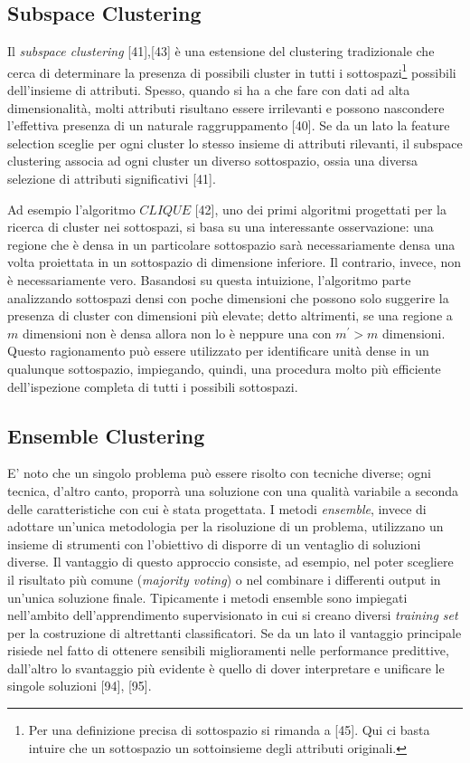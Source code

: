 \subsection{Subspace Clustering}
\label{subsec:subspace_clustering}
Il \textit{subspace clustering} [41],[43] \`e una estensione del clustering tradizionale che cerca di determinare la presenza di possibili cluster in tutti i sottospazi\footnote{Per una definizione precisa di sottospazio si rimanda a [45]. Qui ci basta intuire che un sottospazio un sottoinsieme degli attributi originali.} possibili dell'insieme di attributi.
Spesso, quando si ha a che fare con dati ad alta dimensionalit\`a, molti attributi risultano essere irrilevanti e possono nascondere l'effettiva presenza di un naturale raggruppamento [40]. Se da un lato la feature selection sceglie per ogni cluster lo stesso insieme di attributi rilevanti, il subspace clustering associa ad ogni cluster un diverso sottospazio, ossia una diversa selezione di attributi significativi [41].

Ad esempio l'algoritmo $ CLIQUE $ [42], uno dei primi algoritmi progettati per la ricerca di cluster nei sottospazi, si basa su una interessante osservazione: una regione che \`e densa in un particolare sottospazio sar\`a necessariamente densa una volta proiettata in un sottospazio di dimensione inferiore. Il contrario, invece, non \`e necessariamente vero. Basandosi su questa intuizione, l'algoritmo parte analizzando sottospazi densi con poche dimensioni che possono solo suggerire la presenza di cluster con dimensioni pi\`u elevate; detto altrimenti, se una regione a $ m $ dimensioni non \`e densa allora non lo \`e neppure una con $ m^{'} > m $ dimensioni.
Questo ragionamento  pu\`o essere utilizzato per identificare unit\`a dense in un qualunque sottospazio, impiegando, quindi, una procedura molto pi\`u efficiente dell'ispezione completa di tutti i possibili sottospazi. 
\subsection{Ensemble Clustering}
E' noto che un singolo problema pu\`o essere risolto con tecniche diverse; ogni tecnica, d'altro canto, proporr\`a una soluzione con una qualit\`a variabile a seconda delle caratteristiche con cui \`e stata progettata. I metodi \textit{ensemble}, invece di adottare un'unica metodologia per la risoluzione di un problema, utilizzano un insieme di strumenti con l'obiettivo di disporre di un ventaglio di soluzioni diverse. Il vantaggio di questo approccio consiste, ad esempio, nel poter scegliere il risultato pi\`u comune (\textit{majority voting}) o nel combinare i differenti output in un'unica soluzione finale. Tipicamente i metodi ensemble sono impiegati nell'ambito dell'apprendimento supervisionato in cui si creano diversi \textit{training set} per la costruzione di altrettanti classificatori. Se da un lato il vantaggio principale risiede nel fatto di ottenere sensibili miglioramenti nelle performance predittive, dall'altro lo svantaggio pi\`u evidente \`e quello di dover interpretare e unificare le singole soluzioni [94], [95].

